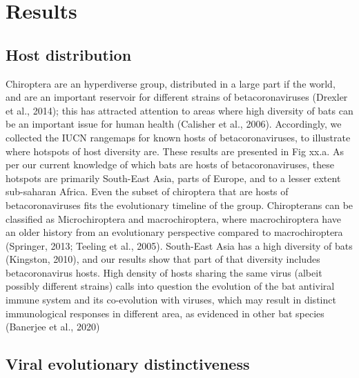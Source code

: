 \documentclass[11pt]{article}
\begin{document}
\hypertarget{results}{%
\section{Results}\label{results}}

\hypertarget{host-distribution}{%
\subsection{Host distribution}\label{host-distribution}}

Chiroptera are an hyperdiverse group, distributed in a large part if the
world, and are an important reservoir for different strains of
betacoronaviruses (Drexler et al., 2014); this has attracted attention
to areas where high diversity of bats can be an important issue for
human health (Calisher et al., 2006). Accordingly, we collected the IUCN
rangemaps for known hosts of betacoronaviruses, to illustrate where
hotspots of host diversity are. These results are presented in Fig xx.a.
As per our current knowledge of which bats are hosts of
betacoronaviruses, these hotspots are primarily South-East Asia, parts
of Europe, and to a lesser extent sub-saharan Africa. Even the subset of
chiroptera that are hosts of betacoronaviruses fits the evolutionary
timeline of the group. Chiropterans can be classified as Microchiroptera
and macrochiroptera, where macrochiroptera have an older history from an
evolutionary perspective compared to macrochiroptera (Springer, 2013;
Teeling et al., 2005). South-East Asia has a high diversity of bats
(Kingston, 2010), and our results show that part of that diversity
includes betacoronavirus hosts. High density of hosts sharing the same
virus (albeit possibly different strains) calls into question the
evolution of the bat antiviral immune system and its co-evolution with
viruses, which may result in distinct immunological responses in
different area, as evidenced in other bat species (Banerjee et al.,
2020)

\hypertarget{viral-evolutionary-distinctiveness}{%
\subsection{Viral evolutionary
distinctiveness}\label{viral-evolutionary-distinctiveness}}
\end{document}
